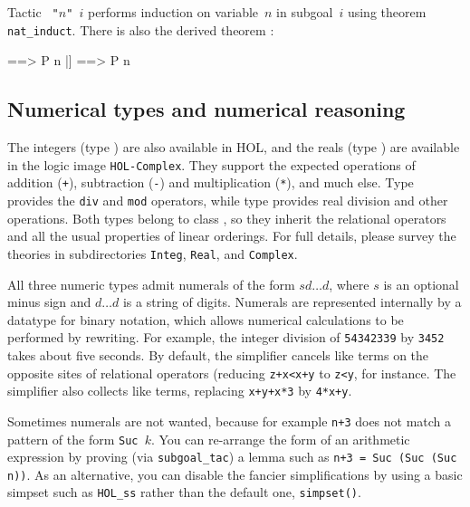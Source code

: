 
Tactic {\tt{} "$n$" $i$} performs induction on variable~$n$
in subgoal~$i$ using theorem \texttt{nat_induct}.  There is also the derived
theorem :
\begin{ttbox}
[| !!n. [| ! m. m<n --> P m |] ==> P n |]  ==>  P n
\end{ttbox}


\subsection{Numerical types and numerical reasoning}

The integers (type ) are also available in HOL, and the reals (type
) are available in the logic image \texttt{HOL-Complex}.  They support
the expected operations of addition (\texttt{+}), subtraction (\texttt{-}) and
multiplication (\texttt{*}), and much else.  Type  provides the
\texttt{div} and \texttt{mod} operators, while type  provides real
division and other operations.  Both types belong to class , so
they inherit the relational operators and all the usual properties of linear
orderings.  For full details, please survey the theories in subdirectories
\texttt{Integ}, \texttt{Real}, and \texttt{Complex}.

All three numeric types admit numerals of the form \texttt{$sd\ldots d$},
where $s$ is an optional minus sign and $d\ldots d$ is a string of digits.
Numerals are represented internally by a datatype for binary notation, which
allows numerical calculations to be performed by rewriting.  For example, the
integer division of \texttt{54342339} by \texttt{3452} takes about five
seconds.  By default, the simplifier cancels like terms on the opposite sites
of relational operators (reducing \texttt{z+x<x+y} to \texttt{z<y}, for
instance.  The simplifier also collects like terms, replacing \texttt{x+y+x*3}
by \texttt{4*x+y}.

Sometimes numerals are not wanted, because for example \texttt{n+3} does not
match a pattern of the form \texttt{Suc $k$}.  You can re-arrange the form of
an arithmetic expression by proving (via \texttt{subgoal_tac}) a lemma such as
\texttt{n+3 = Suc (Suc (Suc n))}.  As an alternative, you can disable the
fancier simplifications by using a basic simpset such as \texttt{HOL_ss}
rather than the default one, \texttt{simpset()}.

